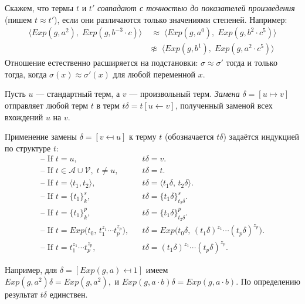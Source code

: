 Скажем, что термы $t$ и $t'$ \emph{совпадают с точностью до показателей произведения}
(пишем $t\approx t'$), если они различаются только значениями степеней.  Например:
\[
\begin{aligned}
\langle Exp(g,a^{2}),\; Exp(g,b^{-3}\!\cdot c) \rangle
&\;\approx\;
\langle Exp(g,a^{0}),\; Exp(g,b^{2}\!\cdot c^{5}) \rangle \\[2pt]
&\not\approx\;
\langle Exp(g,b^{1}),\; Exp(g,a^{2}\!\cdot c^{5}) \rangle
\end{aligned}
\]
Отношение естественно расширяется на подстановки:
$\sigma\approx\sigma'$ тогда и только тогда, когда
$\sigma(x)\approx\sigma'(x)$ для любой переменной $x$.

Пусть $u$ — стандартный терм, а $v$ — произвольный терм.
\emph{Замена} $\delta=[u\!\mapsto\! v]$ отправляет любой терм $t$
в терм $t\delta=t[u\!\leftarrow\! v]$, полученный заменой всех
вхождений $u$ на $v$.

\begin{definition}
Применение замены $\delta=[v\!\mapsfrom\! u]$ к терму $t$ (обозначается $t\delta$)
задаётся индукцией по структуре $t$:
\[
\begin{array}{lcl}
\text{-- If } t = u,               && t\delta = v. \\[2pt]
\text{-- If } t \in \mathcal{A}\cup\mathcal{V},\; t\neq u,
                                && t\delta = t. \\[4pt]
\text{-- If } t = \langle t_{1},t_{2}\rangle,
                                && t\delta = \langle t_{1}\delta,\,t_{2}\delta\rangle. \\[4pt]
\text{-- If } t = \{t_{1}\}^{s}_{k},
                                && t\delta = \{t_{1}\delta\}^{s}_{t_2\delta}. \\[4pt]
\text{-- If } t = \{t_{1}\}^{p}_{k},
                                && t\delta = \{t_{1}\delta\}^{p}_{t_2\delta}. \\[4pt]
\text{-- If } t = Exp\!\bigl(t_{0},\,t_{1}^{z_{1}}\!\cdots t_{p}^{z_{p}}\bigr),
                                && t\delta = Exp\!\bigl(t_{0}\delta,\,(t_{1}\delta)^{z_{1}}\!\cdots(t_{p}\delta)^{z_{p}}\bigr). \\[6pt]
\text{-- If } t = t_{1}^{z_{1}}\!\cdots t_{p}^{z_{p}},
                                && t\delta = (t_{1}\delta)^{z_{1}}\!\cdots (t_{p}\delta)^{z_{p}}.  
\end{array}
\]
\end{definition}

Например, для $\delta=[\!Exp(g,a)\mapsfrom\!1]$ имеем $Exp(g,a^{2})\delta=Exp(g,a^{2}), \text{ и } Exp(g,a\!\cdot\! b)\delta=Exp(g,a\!\cdot\! b)$.
По определению результат $t\delta$ единствен.

